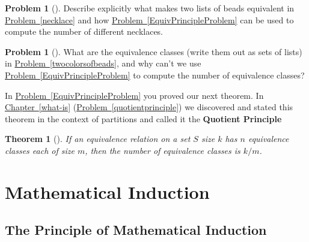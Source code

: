 \documentclass[10pt,]{book}
\newcommand{\terminology}[1]{\textbf{#1}}
\theoremstyle{plain}
\newtheorem{theorem}{Theorem}[section]
\theoremstyle{definition}
\newtheorem{activity}[project]{Problem}
\theoremstyle{definition}
\numberwithin{equation}{chapter}
\begin{document}
\begin{activity}[]\marginsymbol[-1em]{} \label{activity-358}
\hypertarget{p-1969}{}%
Describe explicitly what makes two lists of beads equivalent in \hyperref[necklace]{Problem~\ref{necklace}} and how \hyperref[EquivPrincipleProblem]{Problem~\ref{EquivPrincipleProblem}} can be used to compute the number of different necklaces.%
\end{activity}
\begin{activity}[]\marginsymbol[-1em]{} \label{activity-359}
\hypertarget{p-1971}{}%
What are the equivalence classes (write them out as sets of lists) in \hyperref[twocolorsofbeads]{Problem~\ref{twocolorsofbeads}}, and why can't we use \hyperref[EquivPrincipleProblem]{Problem~\ref{EquivPrincipleProblem}} to compute the number of equivalence classes?%
\end{activity}
\hypertarget{p-1974}{}%
In \hyperref[EquivPrincipleProblem]{Problem~\ref{EquivPrincipleProblem}} you proved our next theorem. In \hyperref[what-is]{Chapter~\ref{what-is}} (\hyperref[quotientprinciple]{Problem~\ref{quotientprinciple}}) we discovered and stated this theorem in the context of partitions and called it the \terminology{Quotient Principle}%
\begin{theorem}[{}]\label{theorem-12}
\hypertarget{p-1975}{}%
If an equivalence relation on a set \(S\) size \(k\) has \(n\) equivalence classes each of size \(m\), then the number of equivalence classes is \(k/m\).%
\end{theorem}
\typeout{************************************************}
\typeout{************************************************}
\chapter[{Mathematical Induction}]{Mathematical Induction}\label{Induction}
\typeout{************************************************}
\typeout{************************************************}
\section[{The Principle of Mathematical Induction}]{The Principle of Mathematical Induction}\label{app2-1-induction}
\typeout{************************************************}
\typeout{************************************************}
\end{document}
